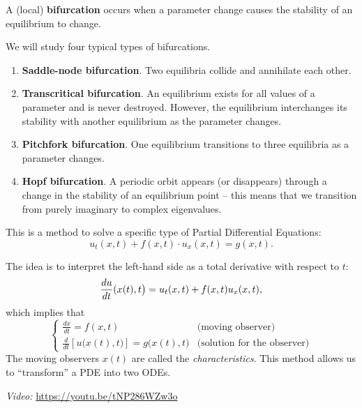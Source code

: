 \begin{SaveDefinition}[key=bifurcations, title={Bifurcations}]

A (local) \textbf{bifurcation} occurs when a parameter change causes the stability of an equilibrium to change.

We will study four typical types of bifurcations.

\begin{enumerate}
	\item \textbf{Saddle-node bifurcation}. Two equilibria collide and annihilate each other.
	\item \textbf{Transcritical bifurcation}. An equilibrium exists for all values of a parameter and is never destroyed. However, the equilibrium interchanges its stability with another equilibrium as the parameter changes.
	\item \textbf{Pitchfork bifurcation}. One equilibrium transitions to three equilibria as a parameter changes.
	\item \textbf{Hopf bifurcation}. A periodic orbit appears (or disappears) through a change in the stability of an equilibrium point -- this means that we transition from purely imaginary to complex eigenvalues.
\end{enumerate}


\end{SaveDefinition}


\begin{SaveDefinition}[key=characteristics, title={Method of Characteristics}]

This is a method to solve a specific type of Partial Differential Equations:
\[
u_t(x,t) + f(x,t) \cdot u_x(x,t) = g(x,t).
\]

The idea is to interpret the left-hand side as a total derivative with respect to $t$:
\[\frac{du}{dt} \bigskip(x(t),t\big) = u_t(x,t) + f(x,t) u_x(x,t),\]
which implies that
\[
\begin{cases}
\frac{dx}{dt} = f(x,t) & \text{(moving observer)} \\
\frac{d}{dt} \left[u\big(x(t),t\big) \right] = g\big(x(t),t\big) & \text{(solution for the observer)}
\end{cases}
\]
The moving observers $x(t)$ are called the \textit{characteristics}.
This method allows us to ``transform'' a PDE into two ODEs.

\hfill \textit{Video: } \url{https://youtu.be/tNP286WZw3o}
\end{SaveDefinition}




